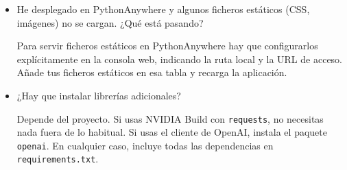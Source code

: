 \begin{itemize}
\item He desplegado en PythonAnywhere y algunos ficheros estáticos (CSS, imágenes) no se cargan. ¿Qué está pasando?

  Para servir ficheros estáticos en PythonAnywhere hay que configurarlos explícitamente en la consola web, indicando la ruta local y la URL de acceso. Añade tus ficheros estáticos en esa tabla y recarga la aplicación.

\item ¿Hay que instalar librerías adicionales?

  Depende del proyecto. Si usas NVIDIA Build con \verb|requests|, no necesitas nada fuera de lo habitual. Si usas el cliente de OpenAI, instala el paquete \verb|openai|. En cualquier caso, incluye todas las dependencias en \verb|requirements.txt|.

\end{itemize}
